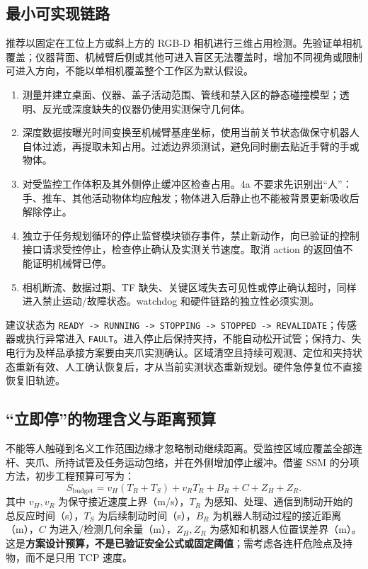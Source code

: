 \subsection{最小可实现链路}

推荐以固定在工位上方或斜上方的 RGB-D 相机进行三维占用检测。先验证单相机覆盖；仪器背面、机械臂后侧或其他可进入盲区无法覆盖时，增加不同视角或限制可进入方向，不能以单相机覆盖整个工作区为默认假设。

\begin{enumerate}
  \item 测量并建立桌面、仪器、盖子活动范围、管线和禁入区的静态碰撞模型；透明、反光或深度缺失的仪器仍使用实测保守几何体。
  \item 深度数据按曝光时间变换至机械臂基座坐标，使用当前关节状态做保守机器人自体过滤，再提取未知占用。过滤边界须测试，避免同时删去贴近手臂的手或物体。
  \item 对受监控工作体积及其外侧停止缓冲区检查占用。4a 不要求先识别出“人”：手、推车、其他活动物体均应触发；物体进入后静止也不能被背景更新吸收后解除停止。
  \item 独立于任务规划循环的停止监督模块锁存事件，禁止新动作，向已验证的控制接口请求受控停止，检查停止确认及实测关节速度。取消 action 的返回值不能证明机械臂已停。
  \item 相机断流、数据过期、TF 缺失、关键区域失去可见性或停止确认超时，同样进入禁止运动/故障状态。watchdog 和硬件链路的独立性必须实测。
\end{enumerate}

建议状态为 \texttt{READY -> RUNNING -> STOPPING -> STOPPED -> REVALIDATE}；传感器或执行异常进入 \texttt{FAULT}。进入停止后保持夹持，不能自动松开试管；保持力、失电行为及样品承接方案要由夹爪实测确认。区域清空且持续可观测、定位和夹持状态重新有效、人工确认恢复后，才从当前实测状态重新规划。硬件急停复位不直接恢复旧轨迹。

\subsection{“立即停”的物理含义与距离预算}

不能等人触碰到名义工作范围边缘才忽略制动继续距离。受监控区域应覆盖全部连杆、夹爪、所持试管及任务运动包络，并在外侧增加停止缓冲。借鉴 SSM 的分项方法\cite{marvel2017ssm}，初步工程预算可写为：
\begin{equation}
S_{\mathrm{budget}} = v_H(T_R+T_S) + v_R T_R + B_R + C + Z_H + Z_R .
\end{equation}
其中 $v_H,v_R$ 为保守接近速度上界（m/s），$T_R$ 为感知、处理、通信到制动开始的总反应时间（s），$T_S$ 为后续制动时间（s），$B_R$ 为机器人制动过程的接近距离（m），$C$ 为进入/检测几何余量（m），$Z_H,Z_R$ 为感知和机器人位置误差界（m）。这是\textbf{方案设计预算，不是已验证安全公式或固定阈值}；需考虑各连杆危险点及持物，而不是只用 TCP 速度。

